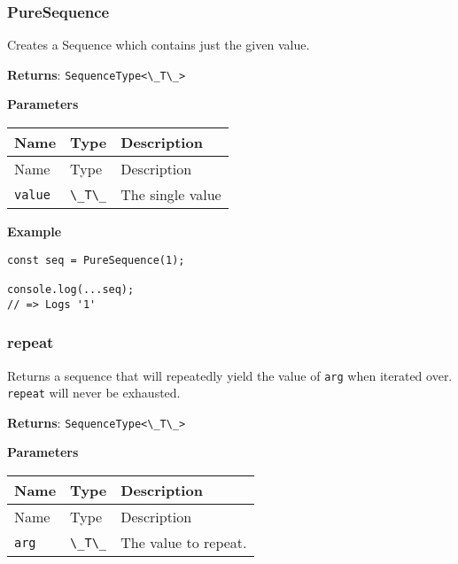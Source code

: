 \hypertarget{c35d49b1-5a40-4fb7-b9cd-225357873654}{%
\subsubsection{PureSequence}\label{c35d49b1-5a40-4fb7-b9cd-225357873654}}

Creates a Sequence which contains just the given value.

\textbf{Returns}: \passthrough{\lstinline!SequenceType<\_T\_>!}

\textbf{Parameters}

\begin{longtable}[]{
  >{\raggedright\arraybackslash}p{}
  >{\raggedright\arraybackslash}p{}
  >{\raggedright\arraybackslash}p{}@{}}

\toprule\noalign{}
Name & Type & Description \\
\midrule\noalign{}
\endfirsthead
\toprule\noalign{}
Name & Type & Description \\
\midrule\noalign{}
\endhead
\bottomrule\noalign{}
\endlastfoot
\passthrough{\lstinline!value!} & \passthrough{\lstinline!\_T\_!} & The
single value \\
\end{longtable}

\textbf{Example}

\begin{lstlisting}[label=2effd3f2-45c8-4259-a1bd-334cff141bed]
const seq = PureSequence(1);
                            
console.log(...seq);
// => Logs '1'
\end{lstlisting}

\hypertarget{f195d9e4-f348-46ee-9ddf-a56012126598}{%
\subsubsection{repeat}\label{f195d9e4-f348-46ee-9ddf-a56012126598}}

Returns a sequence that will repeatedly yield the value of
\passthrough{\lstinline!arg!} when iterated over.
\passthrough{\lstinline!repeat!} will never be exhausted.

\textbf{Returns}: \passthrough{\lstinline!SequenceType<\_T\_>!}

\textbf{Parameters}

\begin{longtable}[]{
  >{\raggedright\arraybackslash}p{}
  >{\raggedright\arraybackslash}p{}
  >{\raggedright\arraybackslash}p{}@{}}

\toprule\noalign{}
Name & Type & Description \\
\midrule\noalign{}
\endfirsthead
\toprule\noalign{}
Name & Type & Description \\
\midrule\noalign{}
\endhead
\bottomrule\noalign{}
\endlastfoot
\passthrough{\lstinline!arg!} & \passthrough{\lstinline!\_T\_!} & The
value to repeat. \\
\end{longtable}

